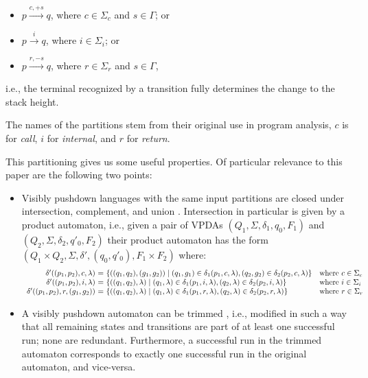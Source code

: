 \documentclass[acmsmall,review,anonymous]{acmart}\settopmatter{printfolios=true,printccs=false,printacmref=false}
\newcommand{\T}{\Sigma} %
\begin{document}
\begin{itemize}
\item $p \xrightarrow{c, +s} q$, where $c \in \T_c$ and $s \in \Gamma$; or
\item $p \xrightarrow{i} q$, where $i \in \T_i$; or
\item $p \xrightarrow{r, -s} q$, where $r \in \T_r$ and $s \in \Gamma$,
\end{itemize}

\noindent i.e., the terminal recognized by a transition fully determines the change to the stack height.

The names of the partitions stem from their original use in program analysis, $c$ is for \emph{call}, $i$ for \emph{internal}, and $r$ for \emph{return}.

This partitioning gives us some useful properties. Of particular relevance to this paper are the following two points:

\begin{itemize}
\item Visibly pushdown languages with the same input partitions are closed under intersection, complement, and union \cite{alurVisiblyPushdownLanguages2004}. Intersection in particular is given by a product automaton, i.e., given a pair of VPDAs $(Q_1, \T, \delta_1, q_0, F_1)$ and $(Q_2, \T, \delta_2, q'_0, F_2)$ their product automaton has the form $(Q_1 \times Q_2, \T, \delta', (q_0, q'_0), F_1 \times F_2)$ where:
  $$
  \begin{array}{r@{\ =\ }ll}
    \delta'((p_1, p_2), c, \lambda) & \{((q_1, q_2), (g_1, g_2)) \mid (q_1, g_1) \in \delta_1(p_1, c, \lambda), (q_2, g_2) \in \delta_2(p_2, c, \lambda) \} & \text{where } c \in \T_c \\
    \delta'((p_1, p_2), i, \lambda) & \{((q_1, q_2), \lambda) \mid (q_1, \lambda) \in \delta_1(p_1, i, \lambda), (q_2, \lambda) \in \delta_2(p_2, i, \lambda) \} & \text{where } i \in \T_i \\
    \delta'((p_1, p_2), r, (g_1, g_2)) & \{((q_1, q_2), \lambda) \mid (q_1, \lambda) \in \delta_1(p_1, r, \lambda), (q_2, \lambda) \in \delta_2(p_2, r, \lambda) \} & \text{where } r \in \T_r \\
  \end{array}
  $$

\item A visibly pushdown automaton can be trimmed \cite{caralpTrimmingVisiblyPushdown2015}, i.e., modified in such a way that all remaining states and transitions are part of at least one successful run; none are redundant. Furthermore, a successful run in the trimmed automaton corresponds to exactly one successful run in the original automaton, and vice-versa.
\end{itemize}
\end{document}
